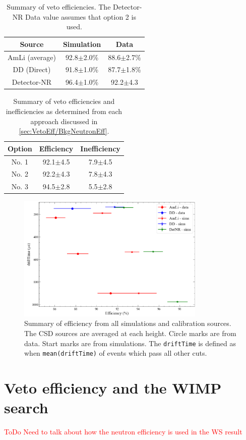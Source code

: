 \begin{table}[!ht]
	\centering
	\begin{tabular}{|c|c|c|}
    \hline
		\textbf{Source}& \textbf{Simulation}& \textbf{Data}\\ 
        \hline
		AmLi (average) & 92.8$\pm$2.0\% & 88.6$\pm$2.7\% \\
		DD (Direct)    & 91.8$\pm$1.0\% & 87.7$\pm$1.8\% \\
		Detector-NR    & 96.4$\pm$1.0\% & 92.2$\pm$4.3\\
        \hline
	\end{tabular}
	\caption{Summary of veto efficiencies.
		The Detector-NR Data value assumes that option 2 is used.}
	\label{tab:VetoEff/final_veto_efficiency}
\end{table}

\begin{table}[!ht]
	\centering
	\begin{tabular}{|c|c|c|}
		\hline
        \textbf{Option} & \textbf{Efficiency}& \textbf{Inefficiency} \\ 
        \hline
		No. 1  & 92.1$\pm$4.5 & 7.9$\pm$4.5  \\
		No. 2  & 92.2$\pm$4.3 & 7.8$\pm$4.3  \\
		No. 3  & 94.5$\pm$2.8 & 5.5$\pm$2.8 \\
        \hline
	\end{tabular}
	\caption{Summary of veto efficiencies and inefficiencies as determined from each approach discussed in \autoref{sec:VetoEff/BkgNeutronEff}.}
	\label{tab:VetoEff/efficiency_options}
\end{table}

\begin{figure}[!ht]
	\centering
	\includegraphics[width=0.8\textwidth]{figures/VetoEfficiency/efficiency_summary.png}
	\caption{Summary of efficiency from all simulations and calibration sources.
		The CSD sources are averaged at each height.
		Circle marks are from data.
		Start marks are from simulations.
		The \lstinline{driftTime} is defined as when \lstinline{mean(driftTime)} of events which pass all other cuts.
	}
	\label{fig:VetoEff/efficiency_summary}
\end{figure}

\section{Veto efficiency and the WIMP search}\label{sec:VetoEff4WIMPSearch}
\textcolor{red}{ToDo Need to talk about how the neutron efficiency is used in the WS result}
